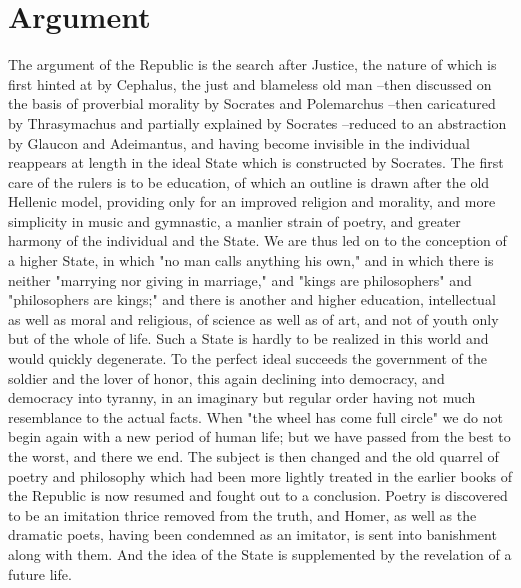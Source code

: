 \section{Argument}

The argument of the Republic is the search after Justice, the nature of which is first hinted at by Cephalus, the just and blameless old man --then discussed on the basis of proverbial morality by Socrates and Polemarchus --then caricatured by Thrasymachus and partially explained by Socrates --reduced to an abstraction by Glaucon and Adeimantus, and having become invisible in the individual reappears at length in the ideal State which is constructed by Socrates. The first care of the rulers is to be education, of which an outline is drawn after the old Hellenic model, providing only for an improved religion and morality, and more simplicity in music and gymnastic, a manlier strain of poetry, and greater harmony of the individual and the State. We are thus led on to the conception of a higher State, in which "no man calls anything his own," and in which there is neither "marrying nor giving in marriage," and "kings are philosophers" and "philosophers are kings;" and there is another and higher education, intellectual as well as moral and religious, of science as well as of art, and not of youth only but of the whole of life. Such a State is hardly to be realized in this world and would quickly degenerate. To the perfect ideal succeeds the government of the soldier and the lover of honor, this again declining into democracy, and democracy into tyranny, in an imaginary but regular order having not much resemblance to the actual facts. When "the wheel has come full circle" we do not begin again with a new period of human life; but we have passed from the best to the worst, and there we end. The subject is then changed and the old quarrel of poetry and philosophy which had been more lightly treated in the earlier books of the Republic is now resumed and fought out to a conclusion. Poetry is discovered to be an imitation thrice removed from the truth, and Homer, as well as the dramatic poets, having been condemned as an imitator, is sent into banishment along with them. And the idea of the State is supplemented by the revelation of a future life.

